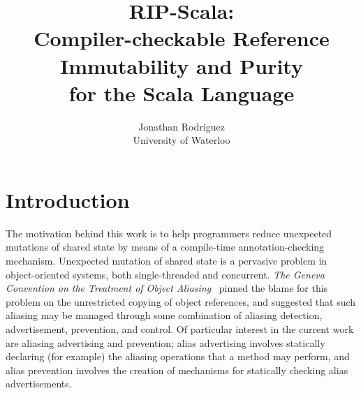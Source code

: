 \documentclass[11pt]{report}
\begin{document}







\title{RIP-Scala:\\Compiler-checkable Reference Immutability and Purity\\for the Scala Language}
\author{Jonathan Rodriguez\\University of Waterloo}
\maketitle




\chapter{Introduction}





The motivation behind this work is to help programmers reduce unexpected
mutations of shared state by means of a compile-time annotation-checking mechanism.
Unexpected mutation of shared state is a pervasive problem in object-oriented systems,
both single-threaded and concurrent.
{\em The Geneva Convention on the Treatment of Object Aliasing}~\cite{geneva}
pinned the blame for this problem on the unrestricted copying of object references,
and suggested that such aliasing may be managed through some combination
of aliasing detection, advertisement, prevention, and control.
Of particular interest in the current work are aliasing advertising
and prevention; alias advertising involves statically declaring (for example)
the aliasing operations that a method may perform, and alias prevention involves
the creation of mechanisms for statically checking alias advertisements.
\end{document}

